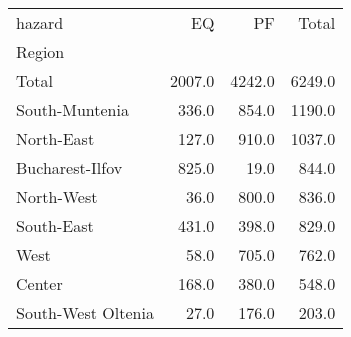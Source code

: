 \begin{tabular}{lrrr}
\toprule
hazard &      EQ &      PF &   Total \\
Region             &         &         &         \\
\midrule
Total              &  2007.0 &  4242.0 &  6249.0 \\
South-Muntenia     &   336.0 &   854.0 &  1190.0 \\
North-East         &   127.0 &   910.0 &  1037.0 \\
Bucharest-Ilfov    &   825.0 &    19.0 &   844.0 \\
North-West         &    36.0 &   800.0 &   836.0 \\
South-East         &   431.0 &   398.0 &   829.0 \\
West               &    58.0 &   705.0 &   762.0 \\
Center             &   168.0 &   380.0 &   548.0 \\
South-West Oltenia &    27.0 &   176.0 &   203.0 \\
\bottomrule
\end{tabular}
